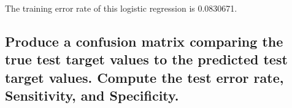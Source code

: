 \documentclass[
  12pt,
  oneside]{report}
\newenvironment{Shaded}{\begin{snugshade}}{\end{snugshade}}
\newcommand{\CommentTok}[1]{\textcolor[rgb]{0.56,0.35,0.01}{\textit{#1}}}
\newcommand{\DataTypeTok}[1]{\textcolor[rgb]{0.13,0.29,0.53}{#1}}
\newcommand{\DecValTok}[1]{\textcolor[rgb]{0.00,0.00,0.81}{#1}}
\newcommand{\FloatTok}[1]{\textcolor[rgb]{0.00,0.00,0.81}{#1}}
\newcommand{\KeywordTok}[1]{\textcolor[rgb]{0.13,0.29,0.53}{\textbf{#1}}}
\newcommand{\NormalTok}[1]{#1}
\newcommand{\OperatorTok}[1]{\textcolor[rgb]{0.81,0.36,0.00}{\textbf{#1}}}
\newcommand{\StringTok}[1]{\textcolor[rgb]{0.31,0.60,0.02}{#1}}
\begin{document}
The training error rate of this logistic regression is 0.0830671.

\newpage

\hypertarget{produce-a-confusion-matrix-comparing-the-true-test-target-values-to-the-predicted-test-target-values.-compute-the-test-error-rate-sensitivity-and-specificity.}{%
\subsection{Produce a confusion matrix comparing the true test target values to the predicted test target values. Compute the test error rate, Sensitivity, and Specificity.}\label{produce-a-confusion-matrix-comparing-the-true-test-target-values-to-the-predicted-test-target-values.-compute-the-test-error-rate-sensitivity-and-specificity.}}

\begin{Shaded}
\end{Shaded}
\end{document}

